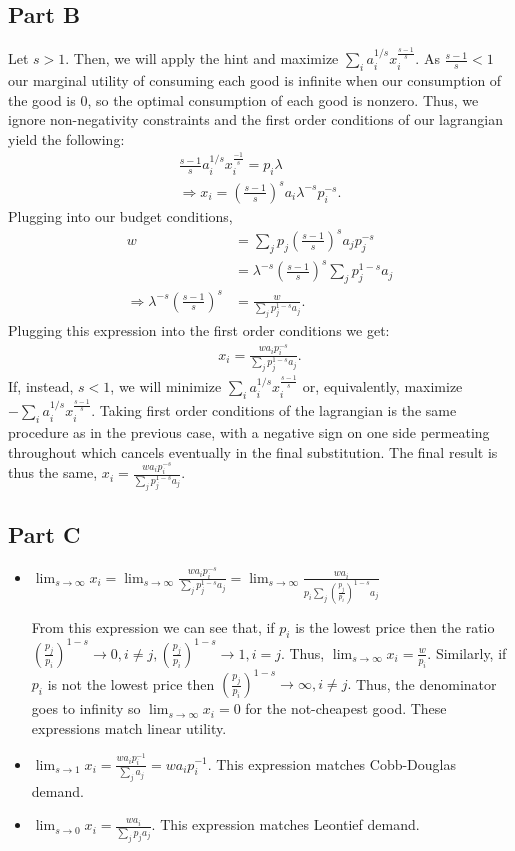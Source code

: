 \documentclass[11pt]{article} %
\begin{document}
\subsection{Part B}
Let $s>1$. Then, we will apply the hint and maximize $\sum_i a_i^{1/s}x_i^{\frac{s-1}{s}}$.  As $\frac{s-1}{s}<1$ our marginal utility of consuming each good is infinite when our consumption of the good is 0, so the optimal consumption of each good is nonzero. Thus, we ignore non-negativity constraints and the first order conditions of our lagrangian yield the following:
\begin{align*}
\frac{s-1}{s}a_i^{1/s}x_i^{\frac{-1}{s}} = p_i\lambda \\
\Rightarrow x_i = \left(\frac{s-1}{s}\right)^sa_i\lambda^{-s}p_i^{-s}.
\end{align*}
Plugging into our budget conditions,
\begin{align*}
w &= \sum_j p_j \left(\frac{s-1}{s}\right)^sa_jp_j^{-s}\\
&=  \lambda^{-s}\left(\frac{s-1}{s}\right)^s \sum_j p_j^{1-s}a_j\\
\Rightarrow  \lambda^{-s}\left(\frac{s-1}{s}\right)^{s} &= \frac{w}{\sum_j p_j^{1-s}a_j}.
\end{align*}
Plugging this expression into the first order conditions we get:
\begin{align*}
x_i =  \frac{w a_i p_i^{-s}}{\sum_j p_j^{1-s}a_j}.
\end{align*}
If, instead, $s<1$, we will minimize $\sum_i a_i^{1/s}x_i^{\frac{s-1}{s}}$ or, equivalently, maximize $-\sum_i a_i^{1/s}x_i^{\frac{s-1}{s}}$. Taking first order conditions of the lagrangian is the same procedure as in the previous case, with a negative sign on one side permeating throughout which cancels eventually in the final substitution. The final result is thus the same, $x_i =  \frac{w a_i p_i^{-s}}{\sum_j p_j^{1-s}a_j}.$
\subsection{Part C}
\begin{itemize}
\item $\lim_{s\rightarrow \infty} x_i = \lim_{s\rightarrow \infty} \frac{w a_i p_i^{-s}}{\sum_j p_j^{1-s}a_j} =  \lim_{s\rightarrow \infty} \frac{w a_i}{p_i\sum_j \left( \frac{p_j}{p_i}\right)^{1-s}a_j}$

From this expression we can see that, if $p_i$ is the lowest price then the ratio $\left( \frac{p_j}{p_i}\right)^{1-s}\rightarrow 0,i\neq j,\left( \frac{p_j}{p_i}\right)^{1-s}\rightarrow 1, i=j.$ Thus, $\lim_{s\rightarrow \infty} x_i = \frac{w}{p_i}$. Similarly, if $p_i$ is not the lowest price then $\left( \frac{p_j}{p_i}\right)^{1-s}\rightarrow \infty,i\neq j.$ Thus, the denominator goes to infinity so $\lim_{s\rightarrow \infty} x_i = 0$ for the not-cheapest good. These expressions match linear utility.
\item $\lim_{s\rightarrow 1} x_i = \frac{w a_i p_i^{-1}}{\sum_j a_j} =w a_i p_i^{-1}$. This expression matches Cobb-Douglas demand.
\item $\lim_{s\rightarrow 0} x_i =  \frac{w a_i }{\sum_j p_ja_j} .$ This expression matches Leontief demand.
\end{itemize}
\end{document}
